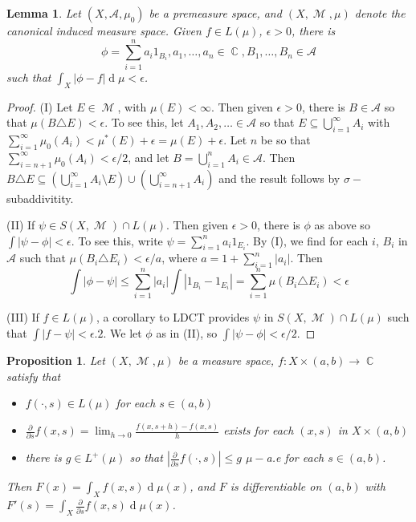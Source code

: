 \documentclass[12pt, a4paper]{memoir}
\DeclareMathOperator{\C}{{\mathbb{C}}}
\newtheorem{lemma}[theorem]{Lemma}
\newtheorem{proposition}[theorem]{Proposition}
\theoremstyle{nonumberplain}
\newtheorem{proof}{Proof}
\DeclareMathOperator{\M}{\mathcal{M}}
\renewcommand{\d}[1]{\ensuremath{\operatorname{d}\!{#1}}} %
\begin{document}
\begin{lemma}
    Let $(X,\mathcal{A},\mu_0)$ be a premeasure space, and $(X,\M,\mu)$ denote the canonical induced measure space.
    Given $f\in L(\mu)$, $\epsilon>0$, there is
    \begin{equation*}
        \phi=\sum\limits_{i=1}^n a_i1_{B_i},a_1,\ldots,a_n\in\C,B_1,\ldots,B_n\in\mathcal{A}
    \end{equation*}
    such that $\int_X|\phi-f|\d{\mu}<\epsilon$.
\end{lemma}
\begin{proof}
    (I) Let $E\in\M$, with $\mu(E)<\infty$.
    Then given $\epsilon>0$, there is $B\in\mathcal{A}$ so that $\mu(B\triangle E)<\epsilon$.
    To see this, let $A_1,A_2,\ldots\in\mathcal{A}$ so that $E\subseteq\bigcup_{i=1}^\infty A_i$ with $\sum_{i=1}^\infty \mu_0(A_i)<\mu^*(E)+\epsilon=\mu(E)+\epsilon$.
    Let $n$ be so that $\sum_{i=n+1}^\infty \mu_0(A_i)<\epsilon/2$, and let $B=\bigcup_{i=1}^n A_i\in\mathcal{A}$.
    Then $B\triangle E\subseteq\left(\bigcup_{i=1}^\infty A_i\setminus E\right)\cup\left(\bigcup_{i=n+1}^\infty A_i\right)$ and the result follows by $\sigma-$subaddivitity.

    (II) If $\psi\in S(X,\M)\cap L(\mu)$.
    Then given $\epsilon>0$, there is $\phi$ as above so $\int|\psi-\phi|<\epsilon$.
    To see this, write $\psi=\sum_{i=1}^n a_i1_{E_i}$.
    By (I), we find for each $i$, $B_i$ in $\mathcal{A}$ such that $\mu(B_i\triangle E_i)<\epsilon/a$, where $a=1+\sum_{i=1}^n|a_i|$.
    Then
    \begin{equation*}
        \int|\phi-\psi|\leq\sum_{i=1}^n|a_i|\int|1_{B_i}-1_{E_i}|=\sum_{i=1}^n \mu(B_i\triangle E_i)<\epsilon
    \end{equation*}

    (III) If $f\in L(\mu)$, a corollary to LDCT provides $\psi$ in $S(X,\M)\cap L(\mu)$ such that $\int|f-\psi|<\epsilon.2$.
    We let $\phi$ as in (II), so $\int|\psi-\phi|<\epsilon/2$.
\end{proof}
\begin{proposition}
    Let $(X,\M,\mu)$ be a measure space, $f:X\times(a,b)\to\C$ satisfy that
    \begin{itemize}[nolistsep]
        \item $f(\cdot,s)\in L(\mu)$ for each $s\in(a,b)$
        \item $\frac{\partial}{\partial s}f(x,s)=\lim_{h\to 0}\frac{f(x,s+h)-f(x,s)}{h}$ exists for each $(x,s)$ in $X\times(a,b)$
        \item there is $g\in L^+(\mu)$ so that $\left\lvert\frac{\partial}{\partial s}f(\cdot,s)\right\rvert\leq g$ $\mu-$a.e for each $s\in(a,b)$.
    \end{itemize}
    Then $F(x)=\int_X f(x,s)\d{\mu(x)}$, and $F$ is differentiable on $(a,b)$ with $F'(s)=\int_X\frac{\partial}{\partial s}f(x,s)\d{\mu(x)}$.
\end{proposition}
\end{document}
